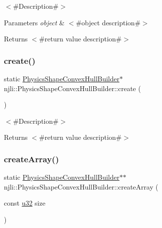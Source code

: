 $<$\#\+Description\#$>$


\begin{DoxyParams}{Parameters}
{\em object} & $<$\#object description\#$>$\\
\hline
\end{DoxyParams}
\begin{DoxyReturn}{Returns}
$<$\#return value description\#$>$ 
\end{DoxyReturn}
\mbox{\label{classnjli_1_1_physics_shape_convex_hull_builder_af4eb31ef7cd00ad25d31c7eb67cea173}} 
\subsubsection{\texorpdfstring{create()}{create()}}
{\footnotesize\ttfamily static \mbox{\hyperlink{classnjli_1_1_physics_shape_convex_hull_builder}{Physics\+Shape\+Convex\+Hull\+Builder}}$\ast$ njli\+::\+Physics\+Shape\+Convex\+Hull\+Builder\+::create (\begin{DoxyParamCaption}{ }\end{DoxyParamCaption})\hspace{0.3cm}{\ttfamily [static]}}

$<$\#\+Description\#$>$

\begin{DoxyReturn}{Returns}
$<$\#return value description\#$>$ 
\end{DoxyReturn}
\mbox{\label{classnjli_1_1_physics_shape_convex_hull_builder_a0f30f085beeff40b964adf704c5621fb}} 
\subsubsection{\texorpdfstring{create\+Array()}{createArray()}}
{\footnotesize\ttfamily static \mbox{\hyperlink{classnjli_1_1_physics_shape_convex_hull_builder}{Physics\+Shape\+Convex\+Hull\+Builder}}$\ast$$\ast$ njli\+::\+Physics\+Shape\+Convex\+Hull\+Builder\+::create\+Array (\begin{DoxyParamCaption}\item[{const \mbox{\hyperlink{_util_8h_a10e94b422ef0c20dcdec20d31a1f5049}{u32}}}]{size }\end{DoxyParamCaption})\hspace{0.3cm}{\ttfamily [static]}}

